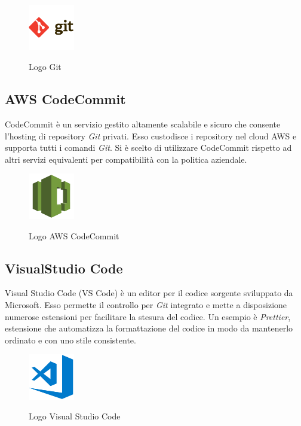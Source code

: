 	\begin{figure}[H]
		\centering
		\includegraphics[width=2cm]{immagini/git.png} \\
		\caption{\label{fig:logo_git} Logo Git}
	\end{figure}

	\subsection{AWS CodeCommit}
	CodeCommit è un servizio gestito altamente scalabile e sicuro che consente l'hosting di \gls{repository} \emph{Git} privati. Esso custodisce i \gls{repository} nel cloud \gls{AWS} e supporta tutti i comandi \emph{Git}. Si è scelto di utilizzare CodeCommit rispetto ad altri servizi equivalenti per compatibilità con la politica aziendale.
	
	\begin{figure}[H]
		\centering
		\includegraphics[width=2cm]{immagini/codecommit.png} \\
		\caption{\label{fig:logo_codecommit} Logo AWS CodeCommit}
	\end{figure}

	\subsection{VisualStudio Code}
	Visual Studio Code (VS Code) è un editor per il codice sorgente sviluppato da Microsoft. Esso permette il controllo per \emph{Git} integrato e mette a disposizione numerose estensioni per facilitare la stesura del codice. Un esempio è \emph{Prettier}, estensione che automatizza la formattazione del codice in modo da mantenerlo ordinato e con uno stile consistente.
	
	\begin{figure}[H]
		\centering
		\includegraphics[width=2cm]{immagini/visual-studio-code.png} \\
		\caption{\label{fig:logo_vscode} Logo Visual Studio Code}
	\end{figure}

